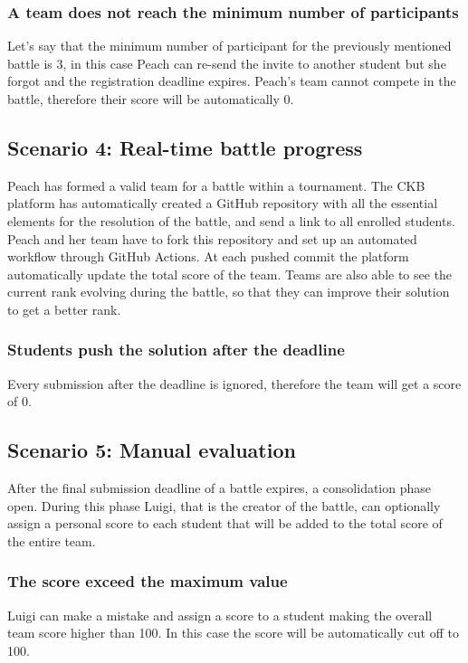 \subsubsection{A team does not reach the minimum number of participants}
Let's say that the minimum number of participant for the  previously mentioned battle is 3, in this case Peach can re-send the invite to another student but she forgot and the registration deadline expires.
Peach's team cannot compete in the battle, therefore their score will be automatically 0.

\subsection{Scenario 4: Real-time battle progress}
Peach has formed a valid team for a battle within a tournament. The CKB platform has automatically created a GitHub repository with all the essential elements for the resolution of the battle, and send a link to all enrolled students.
Peach and her team have to fork this repository and set up an automated workflow 
through GitHub Actions. At each pushed commit the platform automatically update the total score of the team. Teams are also able to see the current rank evolving during the battle, so that they can improve their solution to get a better rank.

\subsubsection{Students push the solution after the deadline}
Every submission after the deadline is ignored, therefore the team will get a score of 0.

\subsection{Scenario 5: Manual evaluation}
After the final submission deadline of a battle expires, a consolidation phase open. During this phase Luigi, that is the creator of the battle, can optionally assign a personal score to each student that will be added to the total score of the entire team.

\subsubsection{The score exceed the maximum value}
Luigi can make a mistake and assign a score to a student making the overall team score higher than 100. In this case the score will be automatically cut off to 100.

